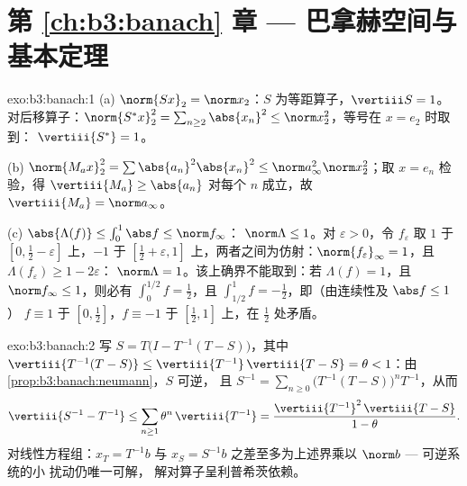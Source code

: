 \section*{第 \ref{ch:b3:banach} 章 --- 巴拿赫空间与
基本定理}

\begin{solution}{exo:b3:banach:1}
(a) $\norm{Sx}_2 = \norm x_2$：$S$ 为等距算子，$\vertiii S =
1$。对后移算子：$\norm{S^*x}_2^2 = \sum_{n \geq
2}\abs{x_n}^2 \leq \norm x_2^2$，等号在 $x = e_2$ 时取到：
$\vertiii{S^*} = 1$。

(b) $\norm{M_ax}_2^2 = \sum\abs{a_n}^2\abs{x_n}^2 \leq \norm
a_\infty^2\norm x_2^2$；取 $x = e_n$ 检验，得 $\vertiii{M_a}
\geq \abs{a_n}$ 对每个 $n$ 成立，故 $\vertiii{M_a} = \norm a_\infty$。

(c) $\abs{\Lambda(f)} \leq \int_0^1\abs f \leq \norm f_\infty$：
$\norm\Lambda \leq 1$。对 $\varepsilon > 0$，令 $f_\varepsilon$
取 $1$ 于 $[0, \frac12 - \varepsilon]$ 上，$-1$ 于 $[\frac12 +
\varepsilon, 1]$ 上，两者之间为仿射：$\norm{f_\varepsilon}_\infty =
1$，且 $\Lambda(f_\varepsilon) \geq 1 - 2\varepsilon$：
$\norm\Lambda = 1$。该上确界不能取到：若 $\Lambda(f) = 1$，且 $\norm
f_\infty \leq 1$，则必有 $\int_0^{1/2}f = \frac12$，且
$\int_{1/2}^1 f = -\frac12$，即（由连续性及 $\abs f \leq 1$）
$f \equiv 1$ 于 $[0, \frac12]$，$f \equiv -1$ 于 $[\frac12,
1]$ 上，在 $\frac12$ 处矛盾。
\end{solution}

\begin{solution}{exo:b3:banach:2}
写 $S = T\bigl(I - T^{-1}(T - S)\bigr)$，其中
$\vertiii{T^{-1}(T-S)} \leq \vertiii{T^{-1}}\,\vertiii{T - S} =
\theta < 1$：由\cref{prop:b3:banach:neumann}，$S$ 可逆，
且 $S^{-1} = \sum_{n\geq0}\bigl(T^{-1}(T -
S)\bigr)^nT^{-1}$，从而
\[
\vertiii{S^{-1} - T^{-1}} \leq
\sum_{n\geq1}\theta^n\,\vertiii{T^{-1}}
= \frac{\vertiii{T^{-1}}^2\,\vertiii{T - S}}{1 - \theta}.
\]
对线性方程组：$x_T = T^{-1}b$ 与 $x_S = S^{-1}b$
之差至多为上述界乘以 $\norm b$ --- 可逆系统的小
扰动仍唯一可解，
解对算子呈利普希茨依赖。
\end{solution}

